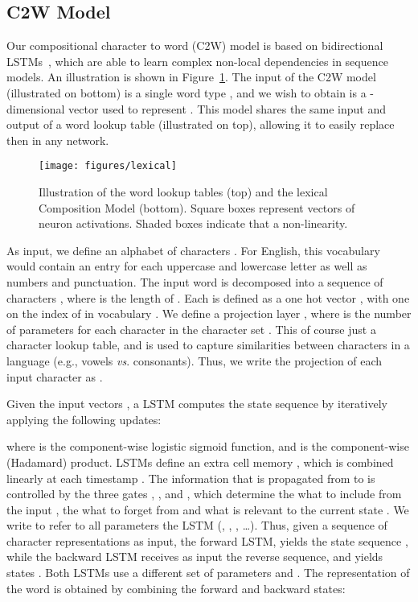 \documentclass[11pt]{article}
\begin{document}
\begin{CJK*}{UTF8}{gbsn}
\section{C2W Model}

Our compositional character to word (C2W) model is based on bidirectional LSTMs~\cite{journals/nn/GravesS05}, which are able to learn complex non-local dependencies in sequence models. An illustration is shown in Figure~\ref{model}. The input of the C2W model (illustrated on bottom) is a single word type , and we wish to obtain is a -dimensional vector used to represent . This model shares the same input and output of a word lookup table (illustrated on top), allowing it to easily replace then in any network.

\begin{figure}[ht]
\begin{center}
\centerline{\texttt{[image: figures/lexical]}}
\caption{Illustration of the word lookup tables (top) and the lexical Composition Model (bottom). Square boxes represent vectors of neuron activations. Shaded boxes indicate that a non-linearity. }
\label{model}
\end{center}
\end{figure} 


As input, we define an alphabet of characters . For English, this vocabulary would contain an entry for each uppercase and lowercase letter as well as numbers and punctuation. The input word  is decomposed into a sequence of characters , where  is the length of . Each  is defined as a one hot vector , with one on the index of  in vocabulary . We define a projection layer , where  is the number of parameters for each character in the character set . This of course just a character lookup table, and is used to capture similarities between characters in a language (e.g., vowels \emph{vs}. consonants). Thus, we write the projection of each input character  as .

Given the input vectors , a LSTM computes the state sequence  by iteratively applying the following updates:


where  is the component-wise logistic sigmoid function, and  is the component-wise (Hadamard) product. LSTMs define an extra cell memory , which is combined linearly at each timestamp . The information that is propagated from  to  is controlled by the three gates , ,  and , which determine the what to include from the input , the what to forget from  and what is relevant to the current state . We write  to refer to all parameters the LSTM (, , , \ldots). Thus, given a sequence of character representations  as input, the forward LSTM, yields the state sequence , while the backward LSTM receives as input the reverse sequence, and yields states . Both LSTMs use a different set of parameters  and . The representation of the word  is obtained by combining the forward and backward states:


\end{CJK*}
\end{document}
